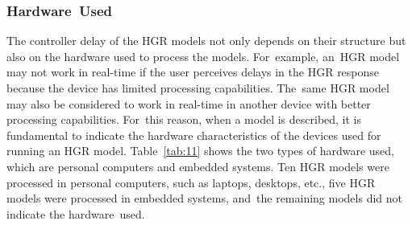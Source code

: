 \documentclass[sensors,review,accept,moreauthors,pdftex]{Definitions/mdpi}
\begin{document}
\subsubsection{Hardware~Used}

The controller delay of the HGR models not only depends on their structure but also on the hardware used to process the models. For~example, an~HGR model may not work in real-time if the user perceives delays in the HGR response because the device has limited processing capabilities. The~same HGR model may also be considered to work in real-time in another device with better processing capabilities. For~this reason, when a model is described, it is fundamental to indicate the hardware characteristics of the devices used for running an HGR model. Table~\ref{tab:11} shows the two types of hardware used, which are personal computers and embedded systems. Ten HGR models were processed in personal computers, such as laptops, desktops, etc., five HGR models were processed in embedded systems, and~the remaining models did not indicate the hardware~used. 
\end{document}
